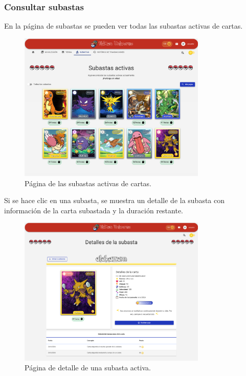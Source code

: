 \subsubsection{Consultar subastas}
En la página de subastas se pueden ver todas las subastas activas de cartas.
\begin{figure}[H]
    \centering
    \includegraphics[width=0.8\textwidth]{figures/6-Analisis/6-Interfaz/interfaz/subastas.png}
    \caption{Página de las subastas activas de cartas.}
    \label{fig:m-interfaz-subastas}
\end{figure}

Si se hace clic en una subasta, se muestra un detalle de la subasta con información de la carta subastada y la duración restante.

\begin{figure}[H]
    \centering
    \includegraphics[width=0.8\textwidth]{figures/6-Analisis/6-Interfaz/interfaz/detalle_subasta.png}
    \caption{Página de detalle de una subasta activa.}
    \label{fig:m-interfaz-detalle-subasta}
\end{figure}


